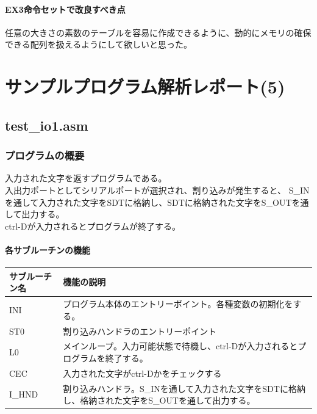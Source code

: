 \documentclass[dvipdfmx,12pt]{jreport}
\begin{document}
\subsubsection{EX3命令セットで改良すべき点}

任意の大きさの素数のテーブルを容易に作成できるように、動的にメモリの確保できる配列を扱えるようにして欲しいと思った。


\chapter*{サンプルプログラム解析レポート(5)}

\section{test\_io1.asm}
\subsection{プログラムの概要}
入力された文字を返すプログラムである。 \\
入出力ポートとしてシリアルポートが選択され、割り込みが発生すると、
S\_INを通して入力された文字をSDTに格納し、SDTに格納された文字をS\_OUTを通して出力する。 \\
ctrl-Dが入力されるとプログラムが終了する。

\subsubsection{各サブルーチンの機能}

\begin{table}[h]
  \begin{tabular}{|l|p{10cm}|} \hline
    サブルーチン名 & 機能の説明 \\ \hline
    INI & プログラム本体のエントリーポイント。各種変数の初期化をする。 \\ \hline
    ST0 & 割り込みハンドラのエントリーポイント \\ \hline
    L0 & メインループ。入力可能状態で待機し、ctrl-Dが入力されるとプログラムを終了する。 \\ \hline
    CEC & 入力された文字がctrl-Dかをチェックする \\ \hline
    I\_HND & 割り込みハンドラ。S\_INを通して入力された文字をSDTに格納し、格納された文字をS\_OUTを通して出力する。 \\ \hline
  \end{tabular}
\end{table}
\end{document}
